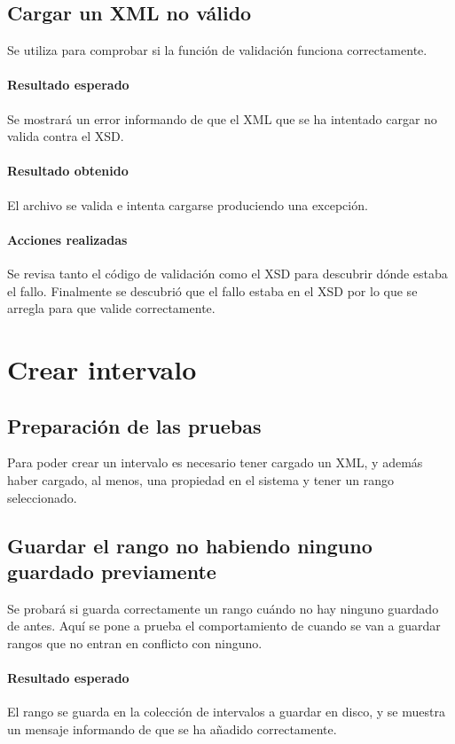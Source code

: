 \subsection{Cargar un XML no v\'alido}
Se utiliza para comprobar si la funci\'on de validaci\'on funciona correctamente.

\paragraph{Resultado esperado}
Se mostrar\'a un error informando de que el XML que se ha intentado cargar
no valida contra el XSD.

\paragraph{Resultado obtenido}
El archivo se valida e intenta cargarse produciendo una
excepci\'on.

\paragraph{Acciones realizadas}
Se revisa tanto el c\'odigo de validaci\'on como el XSD para descubrir
d\'onde estaba el fallo. Finalmente se descubri\'o que el fallo estaba en el
XSD por lo que se arregla para que valide correctamente.

\section{Crear intervalo}
\subsection{Preparaci\'on de las pruebas}
Para poder crear un intervalo es necesario tener cargado un XML, y adem\'as haber cargado,
al menos, una propiedad en el sistema y tener un rango seleccionado.

\subsection{Guardar el rango no habiendo ninguno guardado previamente}
Se probar\'a si guarda correctamente un rango cu\'ando no hay ninguno guardado de antes.
Aqu\'i se pone a prueba el comportamiento de cuando se van a guardar rangos que no entran
en conflicto con ninguno.

\paragraph{Resultado esperado}
El rango se guarda en la colecci\'on de intervalos a guardar en disco, y se 
muestra un mensaje informando de que se ha a\~nadido correctamente.

